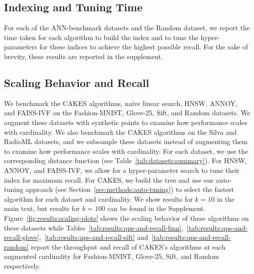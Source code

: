 \subsection{Indexing and Tuning Time}
\label{sec:results:indexing-and-tuning-time}

For each of the ANN-benchmark datasets and the Random dataset, we report the time taken for each algorithm to build the index and to tune the hyper-parameters for these indices to achieve the highest possible recall. For the sake of brevity, these results are reported in the supplement.


\subsection{Scaling Behavior and Recall}
\label{sec:results:scaling-behavior-and-recall}

We benchmark the CAKES algorithms, na\"{i}ve linear search, HNSW, ANNOY, and FAISS-IVF on the Fashion-MNIST, Glove-25, Sift, and Random datasets.
We augment these datasets with synthetic points to examine how performance scales with cardinality.
We also benchmark the CAKES algorithms on the Silva and RadioML datasets, and we subsample these datasets instead of augmenting them to examine how performance scales with cardinality.
For each dataset, we use the corresponding distance function (see Table~\ref{tab:datasets:summary}).
For HNSW, ANNOY, and FAISS-IVF, we allow for a hyper-parameter search to tune their index for maximum recall.
For CAKES, we build the tree and use our auto-tuning approach (see Section~\ref{sec:methods:auto-tuning}) to select the fastest algorithm for each dataset and cardinality.
We show results for $k=10$ in the main text, but results for $k=100$ can be found in the Supplement.
Figure~\ref{fig:results:scaling-plots} shows the scaling behavior of these algorithms on these datasets while Tables~\ref{tab:results:qps-and-recall-fmn},~\ref{tab:results:qps-and-recall-glove},~\ref{tab:results:qps-and-recall-sift} and~\ref{tab:results:qps-and-recall-random} report the throughput and recall of CAKES's algorithms at each augmented cardinality for Fashion-MNIST, Glove-25, Sift, and Random respectively.


